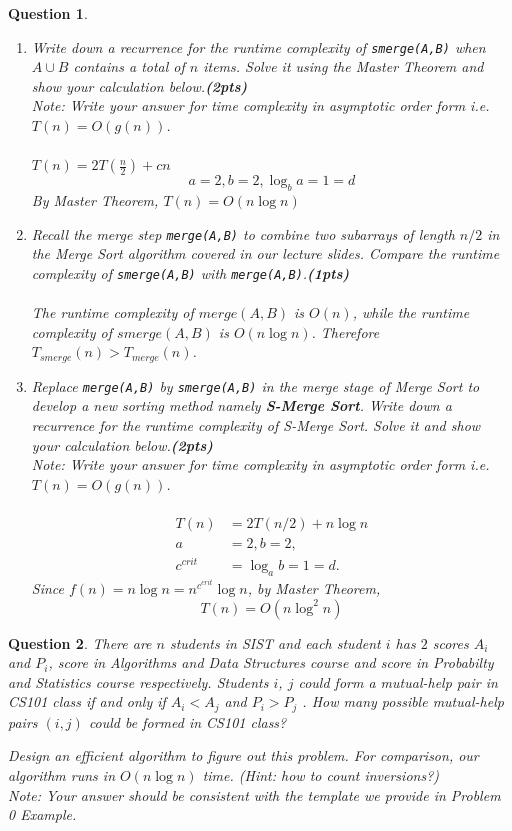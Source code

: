 \documentclass[10.5pt]{article}
\newtheorem{Q}{Question}
\begin{document}
\begin{Q}
\begin{enumerate}[1.]
\item Write down a recurrence for the runtime complexity of \texttt{smerge(A,B)} when $A \cup B$ contains a total of $n$ items. Solve it using the Master Theorem and show your calculation below.\textbf{(2pts)}\\
Note: Write your answer for time complexity in asymptotic order form i.e. $T(n)=O(g(n))$.\\
\\
$T(n) = 2T(\frac n 2) + cn $\\
$$
 a = 2, b = 2, \log_b a = 1 = d
$$
\textup{By Master Theorem, }$T(n) = O(n\log n)$

\item Recall the merge step \texttt{merge(A,B)} to combine two subarrays of length $n/2$ in the Merge Sort algorithm covered in our lecture slides. Compare the runtime complexity of \texttt{smerge(A,B)} with \texttt{merge(A,B)}.\textbf{(1pts)}\\
\\
\textup{The runtime complexity of }$merge(A, B)$\textup{ is }$O(n)$\textup{, while the runtime complexity of }$smerge(A, B)$\textup{ is }$O(n \log n)$. \textup{Therefore }$T_{smerge}(n) > T_{merge}(n)$.\\
\item  Replace \texttt{merge(A,B)} by \texttt{smerge(A,B)} in the merge stage of Merge Sort to develop a new sorting method namely \textbf{S-Merge Sort}. Write down a recurrence for the runtime complexity of S-Merge Sort. Solve it and show your calculation below.\textbf{(2pts)}\\
Note: Write your answer for time complexity in asymptotic order form i.e. $T(n)=O(g(n))$.\\
\\
\begin{align*}
	T(n) &= 2 T(n / 2) + n\log n\\
	a &= 2, b = 2,\\ c^{crit} &= \log_a b = 1	= d.
\end{align*}
\textup{Since }$f(n) = n\log n = n^{c^{crit}}\log n$\textup{, by Master Theorem,}
$$
T(n) =O\left( n\log^2n\right)
$$




\end{enumerate}
\end{Q}
\newpage

\begin{Q}
	There are $n$ students in SIST and each student $i$ has $2$ scores $A_i$ and $P_i$, score in Algorithms and Data Structures course and score in Probabilty and Statistics course respectively. Students $i$, $j$ could form a mutual-help pair in CS101 class if and only
	if $A_i < A_j$ and $P_i > P_j$ . How many possible mutual-help pairs $(i,j)$ could be formed in CS101 class? 
	
	Design an efficient algorithm  to figure out this problem. For comparison, our
	algorithm runs in $O(n \log n)$ time. (Hint: how to count inversions?)\\

	Note: Your answer should be consistent with the template we provide in Problem 0 Example.
\end{Q}
\end{document}
